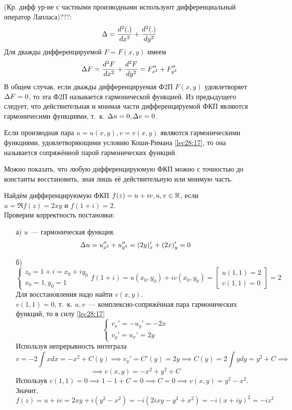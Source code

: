 \documentclass[../../main.tex]{subfiles}
\begin{document}
(Кр. дифф ур-ие с частными производными используют дифференциальный оператор 
Лапласа)???:
\[
\Delta = \dfrac{d^2 (.)}{d x^2} + \dfrac{d^2(.)}{d y^2}
\]
Для дважды дифференцируемой $ F = F(x, y) $ имеем\[
\Delta F = \dfrac{d^2 F}{d x^2} + \dfrac{d^2 F}{d y^2} = 
F_{x^2}'' + F_{y^2}''
\]
В общем случак, если дважды дифференцируемая Ф2П $ F(x, y) $
удовлетворяет $ \Delta F = 0 $, то эта Ф2П называется гармонической функцией.
Из предыдущего следует, что действительная и мнимая части 
дифференцируемой ФКП являются гармоничесими функциями, т.~к.
$ \Delta u = 0, \Delta v = 0 $.

Если производная пара $ u = u(x, y), v = v(x, y) $ являются гармоническими 
функциями, 
удовлетворяющими условию Коши-Римана \eqref{lec28:17},
то она называется сопряжённой парой гармонических функций.

Можно показать, что любую дифференцируюмую ФКП можно с точностью до константы 
восстановить, зная лишь её действительную или мнимую часть.
\begin{exmp}
Найдём дифференцируюмую ФКП $ f(z) = u + iv, u, v\in \mathbb{R} $,
если $ u = \Re f(z) = 2xy $ и $ f(1 + i) = 2 $.\\
Проверим корректность постановки:
\begin{enumerate}
	\item[а)] $ u $~--- гармоническая функция.
	\[\Delta u = u_{x^2}'' + u_{y^2}'' = (2y)_x' + (2x)_y' = 0 \]
	\item[б)] \[
	\begin{cases}
		z_0 = 1 + i = x_0 + iy_0\\
		x_0 = 1, y_0 = 1
	\end{cases}
	f(1 + i) = u(x_0, y_0) + iv(x_0, y_0) = \left[
	\begin{gathered}
		u(1, 1) = 2\\
		v(1, 1) = 0
	\end{gathered}
	\right] = 2
	\]
	Для восстановления надо найти $ v(x, y) $.\\
	$ v(1, 1) = 0 $, т.~к. $ u, v $~--- комплексно-сопряжённая пара
	гармонических функций, то в силу \eqref{lec28:17}
	\[
	\begin{cases}
		v_x' = -u_y' = -2x\\
		v_y' = u_x' = 2y
	\end{cases}
	\]
	Используя непрерывность интеграла \[ 
	v = -2\int x dx = -x^2 + C(y) 
	\implies v_y' = C'(y) = 2y \implies 
	C(y) = 2\int y dy = y^2 + C \implies \]\[ \implies
	v(x, y) = -x^2 + y^2 + C
	\]
	Используя $ v(1, 1) = 0 \implies 1 - 1 + C = 0 \implies C = 0 \implies 
	v(x, y) = y^2 - x^2
	$. Значит, $ f(z) = u + iv = 2xy + i(y^2 - x^2) =
	-i(2ixy - y^2 + x^2) = -i(x + iy)^2 = -iz^2
	$
\end{enumerate}
\end{exmp}
\end{document}
